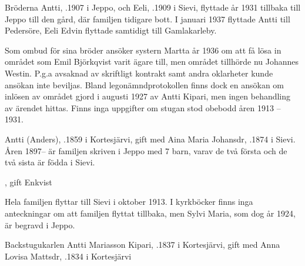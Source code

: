

Bröderna Antti, .1907 i Jeppo, och Eeli, .1909 i Sievi, flyttade år 1931 tillbaka till Jeppo till den gård, där familjen tidigare bott. I januari 1937 flyttade Antti till Pedersöre, Eeli Edvin flyttade samtidigt till Gamlakarleby.

Som ombud för sina bröder ansöker systern Martta år 1936 om att få lösa in området som Emil Björkqvist varit ägare till, men området tillhörde nu Johannes Westin. P.g.a avsaknad av skriftligt kontrakt samt andra oklarheter kunde ansökan inte beviljas. Bland legonämndprotokollen finns dock en ansökan om inlösen av området gjord i augusti 1927 av Antti Kipari, men ingen behandling av ärendet hittas.
Finns inga uppgifter om stugan stod obebodd åren 1913 – 1931.


Antti (Anders), .1859 i Kortesjärvi, gift med Aina Maria Johansdr, .1874 i Sievi. Åren 1897-- är familjen skriven i Jeppo med 7 barn, varav de två första och de två sista är födda i Sievi.
\begin{jhchildren}
  \item {}
  \item {}, gift Enkvist
  \item {}
  \item {}
  \item {}
  \item {}
  \item {}
\end{jhchildren}
Hela familjen flyttar till Sievi i oktober 1913. I kyrkböcker finns inga anteckningar om att familjen flyttat tillbaka, men Sylvi Maria, som dog år 1924, är begravd i Jeppo.


Backstugukarlen Antti Mariasson Kipari, .1837 i Kortesjärvi, gift med Anna Lovisa Mattsdr, .1834 i Kortesjärvi

